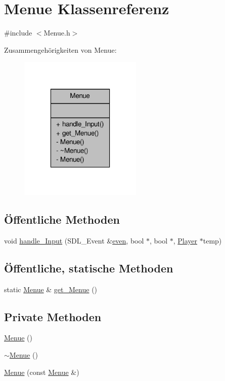 \hypertarget{class_menue}{\section{Menue Klassenreferenz}
\label{class_menue}
}


{\ttfamily \#include $<$Menue.\-h$>$}



Zusammengehörigkeiten von Menue\-:
\nopagebreak
\begin{figure}[H]
\begin{center}
\leavevmode
\includegraphics[width=166pt]{class_menue__coll__graph}
\end{center}
\end{figure}
\subsection*{Öffentliche Methoden}
\begin{DoxyCompactItemize}
\item 
void \hyperlink{class_menue_adab670791d2a103a26626b700698376d}{handle\-\_\-\-Input} (S\-D\-L\-\_\-\-Event \&\hyperlink{main_8cpp_af6a41c81a6372a814ffae9ba6615e1e7}{even}, bool $\ast$, bool $\ast$, \hyperlink{class_player}{Player} $\ast$temp)
\end{DoxyCompactItemize}
\subsection*{Öffentliche, statische Methoden}
\begin{DoxyCompactItemize}
\item 
static \hyperlink{class_menue}{Menue} \& \hyperlink{class_menue_a91bc6d5c4bb7214cd818223cdde9ef88}{get\-\_\-\-Menue} ()
\end{DoxyCompactItemize}
\subsection*{Private Methoden}
\begin{DoxyCompactItemize}
\item 
\hyperlink{class_menue_a9a0c132c1ba8c2d8a6b7fb7c4856cb58}{Menue} ()
\item 
\hyperlink{class_menue_a6c7ab41df462dd5c23fc9cfb7dab9757}{$\sim$\-Menue} ()
\item 
\hyperlink{class_menue_a53ab853c8978bf3ce98edd02eb9094e6}{Menue} (const \hyperlink{class_menue}{Menue} \&)
\end{DoxyCompactItemize}


